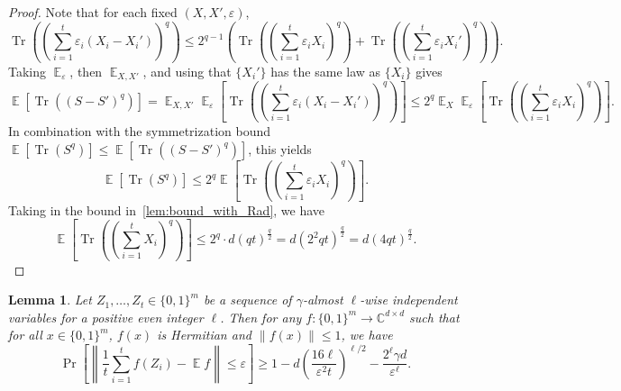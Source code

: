 \documentclass[10pt,a4paper]{article}
\newtheorem{lemma}[theorem]{Lemma}
\newcommand{\C}{\mathbb{C}}
\DeclareMathOperator*{\E}{\mathbb{E}}
\DeclareMathOperator*{\Tr}{Tr}
\newcommand{\eps}{\varepsilon}
\newcommand{\1}{\mathbbm{1}}
\newcommand{\norm}[1]{\left\lVert #1\right\rVert}
\newcommand{\zo}{\{0, 1\}}
\newcommand{\Prb}[2][]{\Pr_{#1}\left[#2\right]}
\begin{document}
\begin{proof}
Note that for each fixed $(X,X',\varepsilon)$,
\[
   \Tr\left(\left(\sum_{i=1}^t \varepsilon_i (X_i - X_i')\right)^{q}\right)
    \le 
   2^{ q-1}\left(\Tr\left((\sum_{i=1}^t \varepsilon_i X_i)^{q}\right)
                 + \Tr\left((\sum_{i=1}^t \varepsilon_i X_i')^{q}\right)\right).
\]
Taking $\E_{\varepsilon}$, then $\E_{X,X'}$, and using that $\{X_i'\}$ has the same law as $\{X_i\}$ gives
\[
   \E\left[\Tr\left((S - S')^{q}\right)\right]
    = 
   \E_{X,X'} \E_{\varepsilon}\left[\Tr\left((\sum_{i=1}^t \varepsilon_i (X_i - X_i'))^{q}\right)\right]
    \le 
   2^{ q} \E_{X} \E_{\varepsilon}\left[\Tr\left((\sum_{i=1}^t \varepsilon_i X_i)^{q}\right)\right].
\]
In combination with the symmetrization bound 
\(\E[\Tr(S^{q})]\le \E[\Tr((S-S')^{q})]\),
this yields
\[
   \E\left[\Tr(S^{q})\right]
    \le 
   2^{ q} \E\left[\Tr\left((\sum_{i=1}^t \varepsilon_i X_i)^{q}\right)\right].
\]
Taking in the bound in~\cref{lem:bound_with_Rad}, we have 
\[
   \E\left[\Tr\left(\left(\sum_{i=1}^t X_i\right)^{q}\right)\right]
    \le 
   2^{ q} \cdot d (q t)^{ \frac{q}{2}}
    = 
   d \left(2^{2} q t\right)^{ \frac{q}{2}}
    = 
   d \left(4 q t\right)^{ \frac{q}{2}}.
\]
\end{proof}



\begin{lemma}
\label{lem:matrix_k_wise_concentration}
    Let $Z_1, \dots, Z_t \in \zo^m$ be a sequence of $\gamma$-almost $\ell$-wise independent  variables for a positive even  integer $\ell$. Then for any $f: \zo^m \to \C^{d \times d}$ such that for all $x \in \zo^m$, $f(x)$ is Hermitian and $\|f(x)\| \le 1$, we have \[
        \Prb{\norm{\frac{1}{t}\sum_{i=1}^t f(Z_i) - \E f} \le \eps} \ge 1 - 
        d \left( \frac{16\ell}{\eps^2 t} \right)^{\ell/2} - \frac{2^\ell \gamma d}{\eps^\ell}.
\]
\end{lemma}
\end{document}
